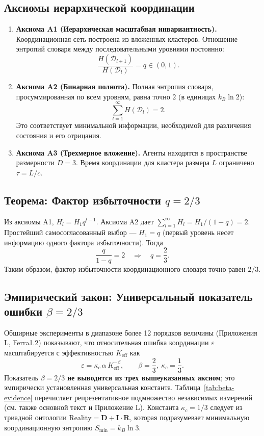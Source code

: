 \documentclass[11pt,a4paper]{article}
\begin{document}
	\subsection{Аксиомы иерархической координации}
	
	\begin{enumerate}
		\item \textbf{Аксиома A1 (Иерархическая масштабная инвариантность).} Координационная сеть построена из вложенных кластеров. Отношение энтропий словаря между последовательными уровнями постоянно:
		\[
		\frac{H(\mathcal{D}_{l+1})}{H(\mathcal{D}_l)} = q \in (0,1).
		\]
		
		\item \textbf{Аксиома A2 (Бинарная полнота).} Полная энтропия словаря, просуммированная по всем уровням, равна точно \(2\) (в единицах \(k_B\ln 2\)):
		\[
		\sum_{l=1}^{\infty} H(\mathcal{D}_l) = 2.
		\]
		Это соответствует минимальной информации, необходимой для различения состояния и его отрицания.
		
		\item \textbf{Аксиома A3 (Трехмерное вложение).} Агенты находятся в пространстве размерности \(D=3\). Время координации для кластера размера \(L\) ограничено \(\tau = L/c\).
	\end{enumerate}
	
	\subsection{Теорема: Фактор избыточности \(q = 2/3\)}
	
	Из аксиомы A1, \(H_l = H_1 q^{l-1}\). Аксиома A2 дает \(\sum_{l=1}^\infty H_l = H_1/(1-q) = 2\). Простейший самосогласованный выбор — \(H_1 = q\) (первый уровень несет информацию одного фактора избыточности). Тогда
	\[
	\frac{q}{1-q} = 2 \quad\Longrightarrow\quad \boxed{q = \frac{2}{3}}.
	\]
	Таким образом, фактор избыточности координационного словаря точно равен \(2/3\).
	
	\subsection{Эмпирический закон: Универсальный показатель ошибки \(\beta = 2/3\)}
	
	Обширные эксперименты в диапазоне более 12 порядков величины (Приложения L, Ferra1.2) показывают, что относительная ошибка координации \(\varepsilon\) масштабируется с эффективностью \(K_{\mathrm{eff}}\) как
	\[
	\varepsilon = \kappa_c \, \alpha \, K_{\mathrm{eff}}^{-\beta}, \qquad \boxed{\beta = \frac{2}{3}},\ \kappa_c = \frac{1}{3}.
	\]
	Показатель \(\beta = 2/3\) \textbf{не выводится из трех вышеуказанных аксиом}; это эмпирически установленная универсальная константа. Таблица~\ref{tab:beta-evidence} перечисляет репрезентативное подмножество независимых измерений (см. также основной текст и Приложение L). Константа \(\kappa_c = 1/3\) следует из триадной онтологии \(\text{Reality} = \mathbf{D} + \mathbf{I}\!\cdot\!\mathbf{R}\), которая подразумевает минимальную координационную энтропию \(S_{\min}=k_B\ln 3\).
	
\end{document}
